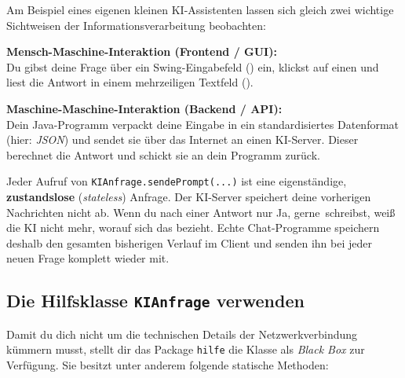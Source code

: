 Am Beispiel eines eigenen kleinen KI-Assistenten lassen sich gleich zwei
wichtige Sichtweisen der Informationsverarbeitung beobachten:

\begin{compactenum}[1.]
  \item \textbf{Mensch-Maschine-Interaktion (Frontend / GUI):}\\
  Du gibst deine Frage über ein Swing-Eingabefeld () ein,
  klickst auf einen  und liest die Antwort in einem
  mehrzeiligen Textfeld ().
  \item \textbf{Maschine-Maschine-Interaktion (Backend / API):}\\
  Dein Java-Programm verpackt deine Eingabe in ein standardisiertes Datenformat
  (hier: \emph{JSON}) und sendet sie über das Internet an einen KI-Server.
  Dieser berechnet die Antwort und schickt sie an dein Programm zurück.
\end{compactenum}

\medskip
\begin{center}
\end{center}

\begin{tcolorbox}[colback=blue!5,colframe=lightblue,boxrule=0.8pt,arc=3pt,title={\textbf{Wichtig: Warum hat die KI kein Gedächtnis?}}]
\small
Jeder Aufruf von \lstinline|KIAnfrage.sendePrompt(...)| ist eine eigenständige,
\textbf{zustandslose} (\emph{stateless}) Anfrage. Der KI-Server speichert
deine vorherigen Nachrichten nicht ab. Wenn du nach einer Antwort nur
\glqq Ja, gerne\grqq\ schreibst, weiß die KI nicht mehr, worauf sich das
bezieht. Echte Chat-Programme speichern deshalb den gesamten bisherigen
Verlauf im Client und senden ihn bei jeder neuen Frage komplett wieder mit.
\end{tcolorbox}


\subsection{Die Hilfsklasse \texttt{KIAnfrage} verwenden}

Damit du dich nicht um die technischen Details der Netzwerkverbindung kümmern
musst, stellt dir das Package \texttt{hilfe} die Klasse 
als \emph{Black Box} zur Verfügung. Sie besitzt unter anderem folgende
statische Methoden:

